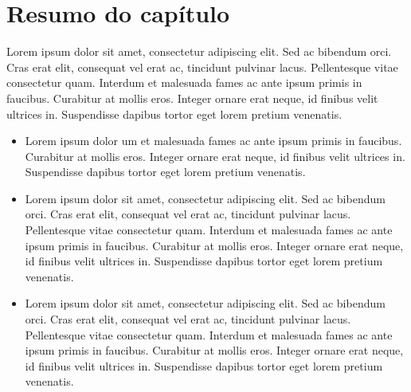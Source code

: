 \documentclass[./main.tex]{subfiles}
\begin{document}
\clearpage

\section{Resumo do capítulo}

\par Lorem ipsum dolor sit amet, consectetur adipiscing elit. Sed ac bibendum orci. Cras erat elit, consequat vel erat ac, tincidunt pulvinar lacus. Pellentesque vitae consectetur quam. Interdum et malesuada fames ac ante ipsum primis in faucibus. Curabitur at mollis eros. Integer ornare erat neque, id finibus velit ultrices in. Suspendisse dapibus tortor eget lorem pretium venenatis.

\begin{itemize}
    \item[$\blacksquare$] Lorem ipsum dolor um et malesuada fames ac ante ipsum primis in faucibus. Curabitur at mollis eros. Integer ornare erat neque, id finibus velit ultrices in. Suspendisse dapibus tortor eget lorem pretium venenatis.
    \item[$\blacksquare$] Lorem ipsum dolor sit amet, consectetur adipiscing elit. Sed ac bibendum orci. Cras erat elit, consequat vel erat ac, tincidunt pulvinar lacus. Pellentesque vitae consectetur quam. Interdum et malesuada fames ac ante ipsum primis in faucibus. Curabitur at mollis eros. Integer ornare erat neque, id finibus velit ultrices in. Suspendisse dapibus tortor eget lorem pretium venenatis.
    \item[$\blacksquare$] Lorem ipsum dolor sit amet, consectetur adipiscing elit. Sed ac bibendum orci. Cras erat elit, consequat vel erat ac, tincidunt pulvinar lacus. Pellentesque vitae consectetur quam. Interdum et malesuada fames ac ante ipsum primis in faucibus. Curabitur at mollis eros. Integer ornare erat neque, id finibus velit ultrices in. Suspendisse dapibus tortor eget lorem pretium venenatis. 
\end{itemize}
\end{document}
